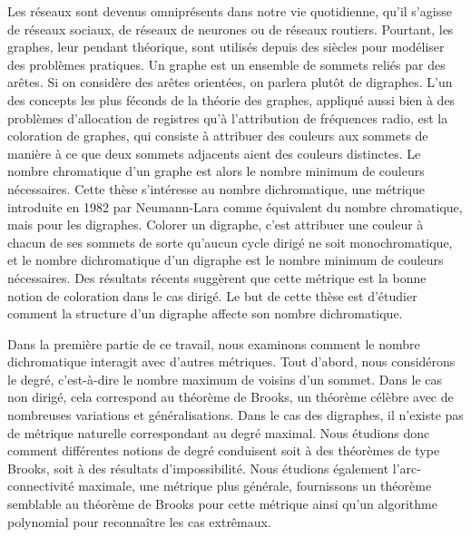 \vspace{0.4cm}
{\small

Les réseaux sont devenus omniprésents dans notre vie quotidienne, qu'il s'agisse de réseaux sociaux, de réseaux de neurones ou de réseaux routiers. Pourtant, les graphes, leur pendant théorique, sont utilisés depuis des siècles pour modéliser des problèmes pratiques. Un graphe est un ensemble de sommets reliés par des arêtes. Si on considère des arêtes orientées, on parlera plutôt de digraphes. L'un des concepts les plus féconds de la théorie des graphes, appliqué aussi bien à des problèmes d'allocation de registres qu'à l'attribution de fréquences radio, est la coloration de graphes, qui consiste à attribuer des couleurs aux sommets de manière à ce que deux sommets adjacents aient des couleurs distinctes. Le nombre chromatique d'un graphe est alors le nombre minimum de couleurs nécessaires. Cette thèse s'intéresse au nombre dichromatique, une métrique introduite en 1982 par Neumann-Lara comme équivalent du nombre chromatique, mais pour les digraphes. Colorer un digraphe, c'est attribuer une couleur à chacun de ses sommets de sorte qu'aucun cycle dirigé ne soit monochromatique, et le nombre dichromatique d'un digraphe est le nombre minimum de couleurs nécessaires. Des résultats récents suggèrent que cette métrique est la bonne notion de coloration dans le cas dirigé. Le but de cette thèse est d'étudier comment la structure d'un digraphe affecte son nombre dichromatique.

\vspace{0.2cm}

Dans la première partie de ce travail, nous examinons comment le nombre dichromatique interagit avec d'autres métriques. Tout d'abord, nous considérons le degré, c'est-à-dire le nombre maximum de voisins d'un sommet. Dans le cas non dirigé, cela correspond au théorème de Brooks, un théorème célèbre avec de nombreuses variations et généralisations. Dans le cas des digraphes, il n'existe pas de métrique naturelle correspondant au degré maximal. Nous étudions donc comment différentes notions de degré conduisent soit à des théorèmes de type Brooks, soit à des résultats d'impossibilité. Nous étudions également l'arc-connectivité maximale, une métrique plus générale, fournissons un théorème semblable au théorème de Brooks pour cette métrique ainsi qu'un algorithme polynomial pour reconnaître les cas extrêmaux.

}
